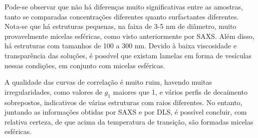 

	Pode-se observar que não há diferenças muito significativas entre as amostras, tanto se comparadas concentrações diferentes quanto surfactantes diferentes. Nota-se que há estruturas pequenas, na faixa de 3-5 nm de diâmetro, muito provavelmente micelas esféricas, como visto anteriormente por SAXS. Além disso, há estruturas com tamanhos de 100 a 300 nm. Devido à baixa viscosidade e transparência das soluções, é possível que existam lamelas em forma de vesículas nessas condições, em conjunto com micelas esféricas.
	
	A qualidade das curvas de correlação é muito ruim, havendo muitas irregularidades, como valores de \(g_1\) maiores que 1, e vários perfis de decaimento sobrepostos, indicativos de várias estruturas com raios diferentes. No entanto, juntando as informações obtidas por SAXS e por DLS, é possível concluir, com relativa certeza, de que acima da temperatura de transição, são formadas micelas esféricas. 
	
